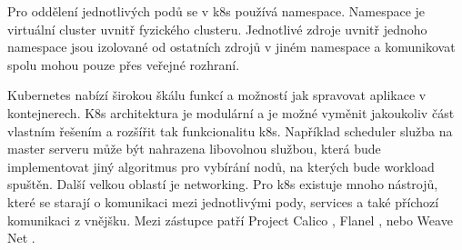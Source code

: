 Pro oddělení jednotlivých podů se v k8s používá namespace. Namespace je virtuální cluster uvnitř fyzického clusteru. Jednotlivé zdroje uvnitř jednoho namespace jsou izolované od ostatních zdrojů v jiném namespace a komunikovat spolu mohou pouze přes veřejné rozhraní. \par
Kubernetes nabízí širokou škálu funkcí a možností jak spravovat aplikace v kontejnerech. K8s architektura je modulární a je možné vyměnit jakoukoliv část vlastním řešením a rozšířit tak funkcionalitu k8s. Například scheduler služba na master serveru může být nahrazena libovolnou službou, která bude implementovat jiný algoritmus pro vybírání nodů, na kterých bude workload spuštěn. Další velkou oblastí je \linebreak networking. Pro k8s existuje mnoho nástrojů, které se starají o komunikaci mezi jednotlivými pody, services a také příchozí komunikaci z vnějšku. Mezi zástupce patří Project Calico \cite{calico}, Flanel \cite{flanel}, nebo Weave Net \cite{weave}. 

